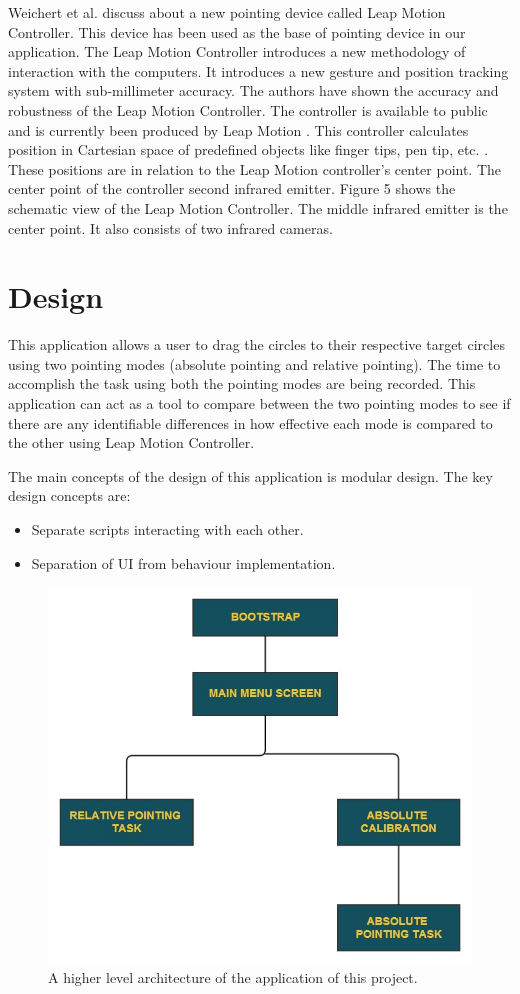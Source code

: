 \documentclass[titlepage]{article}
\begin{document}
Weichert et al. \cite{4} discuss about a new pointing device called Leap Motion Controller. This device has been used as the base of pointing device in our application. The Leap Motion Controller introduces a new methodology of interaction with the computers. It introduces a new gesture and position tracking system with sub-millimeter accuracy. The authors have shown the accuracy and robustness of the Leap Motion Controller. The controller is available to public and is currently been produced by Leap Motion \cite{5}. This controller calculates position in Cartesian space of predefined objects like finger tips, pen tip, etc. \cite{4}. These positions are in relation to the Leap Motion controller’s center point. The center point of the controller second infrared emitter. Figure 5 shows the schematic view of the Leap Motion Controller. The middle infrared emitter is the center point. It also consists of two infrared cameras. 

\section{Design}
This application allows a user to drag the circles to their respective target circles using two pointing modes (absolute pointing and relative pointing). The time to accomplish the task using both the pointing modes are being recorded. This application can act as a tool to compare between the two pointing modes to see if there are any identifiable differences in how effective each mode is compared to the other using Leap Motion Controller. 

The main concepts of the design of this application is modular design. The key design concepts are:

\begin{itemize}
  \item Separate scripts interacting with each other.
  \item Separation of UI from behaviour implementation.
\end{itemize}

\begin{figure}[!h]
\centering
\includegraphics[width=4.5in]{Figure_6}
\caption{A higher level architecture of the application of this project.}
\end{figure}
\end{document}
